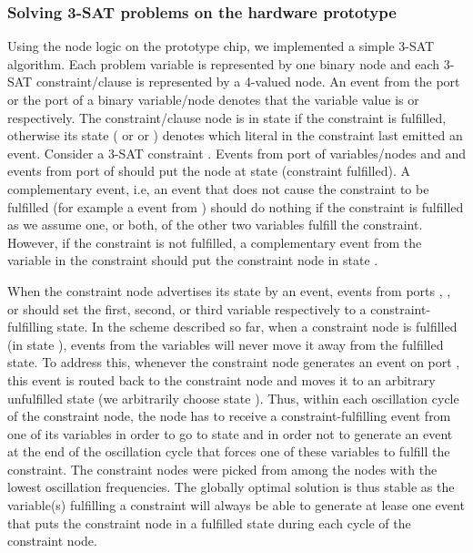 \documentclass[10pt]{article}
\begin{document}
\subsubsection*{Solving 3-SAT problems on the hardware prototype}
Using the node logic on the prototype chip, we implemented a simple 3-SAT algorithm. Each problem variable is represented by one binary node and each 3-SAT constraint/clause is represented by a 4-valued node. An event from the  port or the  port of a binary variable/node denotes that the variable value is  or  respectively. The constraint/clause node is in state  if the constraint is fulfilled, otherwise its state ( or  or ) denotes which literal in the constraint last emitted an event. Consider a 3-SAT constraint . Events from port  of variables/nodes  and  and events from port  of  should put the  node at state  (constraint fulfilled). A complementary event, i.e, an event that does not cause the constraint to be fulfilled (for example a  event from ) should do nothing if the constraint is fulfilled as we assume one, or both, of the other two variables fulfill the constraint. However, if the constraint is not fulfilled, a complementary event from the  variable in the constraint should put the constraint node in state . 

When the constraint node advertises its state by an event, events from ports , , or  should set the first, second, or third variable respectively to a constraint-fulfilling state. In the scheme described so far, when a constraint node is fulfilled (in state ), events from the variables will never move it away from the fulfilled state. To address this, whenever the constraint node generates an event on port , this event is routed back to the constraint node and moves it to an arbitrary unfulfilled state (we arbitrarily choose state ). Thus, within each oscillation cycle of the constraint node, the node has to receive a constraint-fulfilling event from one of its variables in order to go to state  and in order not to generate an event at the end of the oscillation cycle that forces one of these variables to fulfill the constraint. The constraint nodes were picked from among the nodes with the lowest oscillation frequencies. The globally optimal solution is thus stable as the variable(s) fulfilling a constraint will always be able to generate at lease one event that puts the constraint node in a fulfilled state during each cycle of the constraint node.
\end{document}
